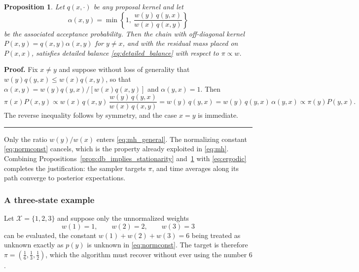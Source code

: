 \documentclass[11pt]{article}
\newtheorem{proposition}{Proposition}
\newenvironment{proof}[1][Proof]{\noindent\textbf{#1.} }{\ \rule{0.5em}{0.5em}}
\begin{document}
\begin{proposition}
Let $q(x,\cdot)$ be any proposal kernel and let
\begin{equation}
    \alpha(x,y)=\min\left\{1,\ \frac{w(y)\,q(y,x)}{w(x)\,q(x,y)}\right\}
    \label{eq:mh_general}
\end{equation}
be the associated acceptance probability. Then the chain with off-diagonal
kernel $P(x,y)=q(x,y)\alpha(x,y)$ for $y\neq x$, and with the residual mass
placed on $P(x,x)$, satisfies detailed balance \eqref{eq:detailed_balance} with
respect to $\pi\propto w$.
\label{prop:mh_db}
\end{proposition}

\begin{proof}
Fix $x\neq y$ and suppose without loss of generality that
$w(y)q(y,x)\leq w(x)q(x,y)$, so that
$\alpha(x,y)=w(y)q(y,x)/\left[w(x)q(x,y)\right]$ and $\alpha(y,x)=1$. Then
\begin{equation*}
    \pi(x)P(x,y)
    \propto w(x)\,q(x,y)\,\frac{w(y)\,q(y,x)}{w(x)\,q(x,y)}
    =w(y)\,q(y,x)
    =w(y)\,q(y,x)\,\alpha(y,x)
    \propto \pi(y)P(y,x).
\end{equation*}
The reverse inequality follows by symmetry, and the case $x=y$ is immediate.
\end{proof}

Only the ratio $w(y)/w(x)$ enters \eqref{eq:mh_general}. The normalizing
constant \eqref{eq:normconst} cancels, which is the property already exploited
in \eqref{eq:mh}. Combining Propositions~\ref{prop:db_implies_stationarity}
and~\ref{prop:mh_db} with \eqref{eq:ergodic} completes the justification: the
sampler targets $\pi$, and time averages along its path converge to posterior
expectations.

\subsubsection*{A three-state example}

Let $\mathcal{X}=\{1,2,3\}$ and suppose only the unnormalized weights
\begin{equation*}
    w(1)=1,\qquad w(2)=2,\qquad w(3)=3
\end{equation*}
can be evaluated, the constant $w(1)+w(2)+w(3)=6$ being treated as unknown
exactly as $p(y)$ is unknown in \eqref{eq:normconst}. The target is therefore
$\pi=\left(\tfrac{1}{6},\tfrac{1}{3},\tfrac{1}{2}\right)$, which the algorithm
must recover without ever using the number $6$.
\end{document}

